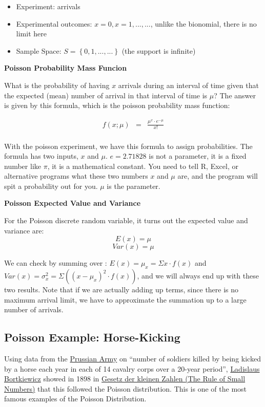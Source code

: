 \documentclass[
]{book}
\providecommand{\tightlist}{%
  \setlength{\itemsep}{0pt}\setlength{\parskip}{0pt}}
\begin{document}
\begin{itemize}
\tightlist
\item
  Experiment: arrivals
\item
  Experimental outcomes: \(x=0,x=1,...,...\), unlike the bionomial, there is no limit here
\item
  Sample Space: \(S=\left\{0,1,...,...\right\}\) (the support is infinite)
\end{itemize}

\textbf{Poisson Probability Mass Funcion}

What is the probability of having \(x\) arrivals during an interval of time given that the expected (mean) number of arrival in that interval of time is \(\mu\)? The answer is given by this formula, which is the poisson probability mass function:

\begin{eqnarray}
f(x;\mu) &=& \frac{\mu^{x} \cdot e^{-\mu}}{x!}\\
\end{eqnarray}

With the poisson experiment, we have this formula to assign probabilities. The formula has two inputs, \(x\) and \(\mu\). \(e=2.71828\) is not a parameter, it is a fixed number like \(\pi\), it is a mathematical constant. You need to tell R, Excel, or alternative programs what these two numbers \(x\) and \(\mu\) are, and the program will spit a probability out for you. \(\mu\) is the parameter.

\textbf{Poisson Expected Value and Variance}

For the Poisson discrete random variable, it turns out the expected value and variance are:
\[E(x) = \mu\]
\[Var(x) = \mu\]

We can check by summing over : \(E(x) = \mu_x = \Sigma x \cdot f(x)\) and \(Var(x) = \sigma_x^2 = \Sigma \left( (x - \mu_x)^2 \cdot f(x) \right)\), and we will always end up with these two results. Note that if we are actually adding up terms, since there is no maximum arrival limit, we have to approximate the summation up to a large number of arrivals.

\hypertarget{poisson-example-horse-kicking}{%
\subsection{Poisson Example: Horse-Kicking}\label{poisson-example-horse-kicking}}

Using data from the \href{https://en.wikipedia.org/wiki/Prussian_Army}{Prussian Army} on ``number of soldiers killed by being kicked by a horse each year in each of 14 cavalry corps over a 20-year period'', \href{https://en.wikipedia.org/wiki/Ladislaus_Bortkiewicz}{Ladislaus Bortkiewicz} showed in 1898 in \href{https://de.wikipedia.org/wiki/Gesetz_der_kleinen_Zahlen}{Gesetz der kleinen Zahlen (The Rule of Small Numbers)} that this followed the Poisson distribution. This is one of the most famous examples of the Poisson Distribution.
\end{document}

